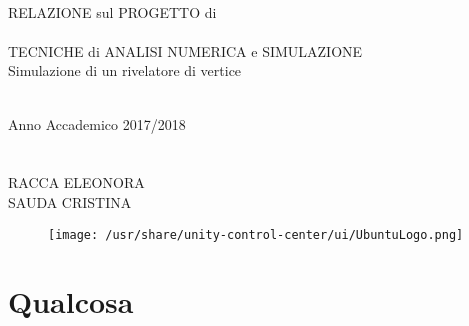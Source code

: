 \documentclass[11pt,a4paper]{article}
\begin{document}
\thispagestyle{empty}

\rmfamily
\begin{center}
\ \\
\vspace{2cm}

\LARGE{\textcolor[rgb]{1,0,0}{RELAZIONE sul PROGETTO di\\ \ \\TECNICHE di ANALISI NUMERICA e SIMULAZIONE}\\}
\huge{\textcolor[rgb]{1,0,0}{Simulazione di un rivelatore di vertice}\\}
\hrulefill \\
\vspace{2cm}

Anno Accademico 2017/2018
\ \\ \ \\ \ \\
\Large{RACCA ELEONORA\\
SAUDA CRISTINA}

\vspace{2cm}
\begin{figure}[h]
\centering
	\texttt{[image: /usr/share/unity-control-center/ui/UbuntuLogo.png]}
\end{figure}

\end{center}

\newpage
\tableofcontents
\newpage

\section{Qualcosa}
\end{document}

